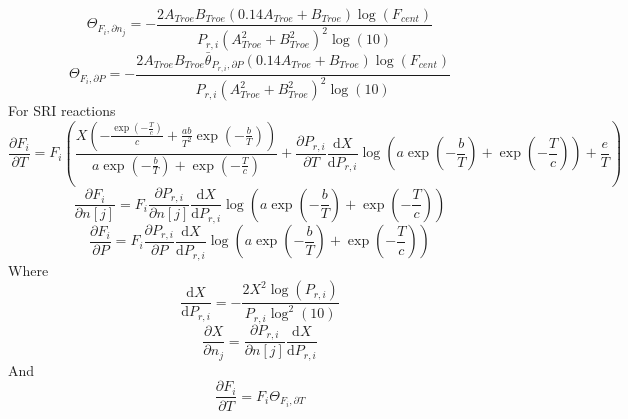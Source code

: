 \documentclass[a4paper,10pt]{article}
\begin{document}
\begin{dmath} \Theta_{F_i, \partial n_j} = - \frac{2 A_{Troe} B_{Troe} \left(0.14 A_{Troe} + B_{Troe}\right) \log{\left (F_{cent} \right )}}{P_{r, i} \left(A_{Troe}^{2} + B_{Troe}^{2}\right)^{2} \log{\left (10 \right )}}\end{dmath} 
\begin{dmath} \Theta_{F_i, \partial P} = - \frac{2 A_{Troe} B_{Troe} \bar{\theta}_{P_{r, i}, \partial P} \left(0.14 A_{Troe} + B_{Troe}\right) \log{\left (F_{cent} \right )}}{P_{r, i} \left(A_{Troe}^{2} + B_{Troe}^{2}\right)^{2} \log{\left (10 \right )}}\end{dmath} 
For SRI reactions
\begin{dmath} \frac{\partial F_{i} }{\partial T } = F_{i} \left(\frac{X \left(- \frac{\operatorname{exp}\left({- \frac{T}{c}}\right)}{c} + \frac{a b}{T^{2}} \operatorname{exp}\left({- \frac{b}{T}}\right)\right)}{a \operatorname{exp}\left({- \frac{b}{T}}\right) + \operatorname{exp}\left({- \frac{T}{c}}\right)} + \frac{\partial P_{r, i} }{\partial T } \frac{\text{d} X }{\text{d} P_{r, i} } \log{\left (a \operatorname{exp}\left({- \frac{b}{T}}\right) + \operatorname{exp}\left({- \frac{T}{c}}\right) \right )} + \frac{e}{T}\right)\end{dmath} 
\begin{dmath} \frac{\partial F_{i} }{\partial n[j] } = F_{i} \frac{\partial P_{r, i} }{\partial n[j] } \frac{\text{d} X }{\text{d} P_{r, i} } \log{\left (a \operatorname{exp}\left({- \frac{b}{T}}\right) + \operatorname{exp}\left({- \frac{T}{c}}\right) \right )}\end{dmath} 
\begin{dmath} \frac{\partial F_{i} }{\partial P } = F_{i} \frac{\partial P_{r, i} }{\partial P } \frac{\text{d} X }{\text{d} P_{r, i} } \log{\left (a \operatorname{exp}\left({- \frac{b}{T}}\right) + \operatorname{exp}\left({- \frac{T}{c}}\right) \right )}\end{dmath} 
Where
\begin{dmath} \frac{\text{d} X }{\text{d} P_{r, i} } = - \frac{2 X^{2} \log{\left (P_{r, i} \right )}}{P_{r, i} \log^{2}{\left (10 \right )}}\end{dmath} 
\begin{dmath} \frac{\partial X}{\partial n_j} = \frac{\partial P_{r, i} }{\partial n[j] } \frac{\text{d} X }{\text{d} P_{r, i} }\end{dmath} 
And
\begin{dmath} \frac{\partial F_{i} }{\partial T } = F_{i} \Theta_{F_i, \partial T}\end{dmath} 
\end{document}
